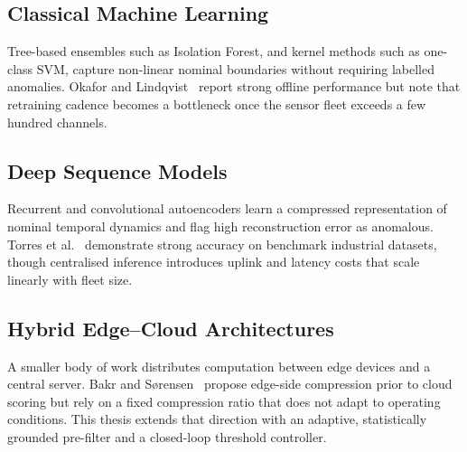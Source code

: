 \subsection{Classical Machine Learning}
Tree-based ensembles such as Isolation Forest, and kernel methods such as one-class SVM,
capture non-linear nominal boundaries without requiring labelled anomalies. Okafor and
Lindqvist~\cite{okafor2023} report strong offline performance but note that retraining
cadence becomes a bottleneck once the sensor fleet exceeds a few hundred channels.

\subsection{Deep Sequence Models}
Recurrent and convolutional autoencoders learn a compressed representation of nominal
temporal dynamics and flag high reconstruction error as anomalous. Torres et al.~\cite{torres2022}
demonstrate strong accuracy on benchmark industrial datasets, though centralised inference
introduces uplink and latency costs that scale linearly with fleet size.

\subsection{Hybrid Edge--Cloud Architectures}
A smaller body of work distributes computation between edge devices and a central server.
Bakr and Sørensen~\cite{bakr2021} propose edge-side compression prior to cloud scoring but
rely on a fixed compression ratio that does not adapt to operating conditions. This thesis
extends that direction with an adaptive, statistically grounded pre-filter and a
closed-loop threshold controller.

\begin{table}[htbp]
\centering
\caption{Comparison of representative anomaly detection approaches.}
\label{tab:litcompare}
\end{table}
